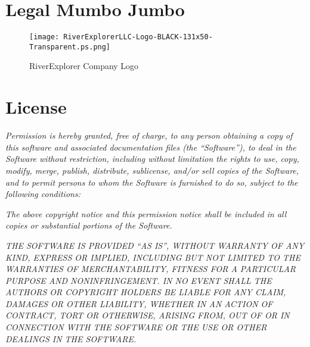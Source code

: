 \section{Legal Mumbo Jumbo}

  \begin{figure}
    \centering
    \texttt{[image: RiverExplorerLLC-Logo-BLACK-131x50-Transparent.ps.png]}
    \caption{RiverExplorer Company Logo}
    \label{fig:RiverExplorerLogo}
  \end{figure}
  
\section{License}
\textit{Permission is hereby granted, free of charge, to any person obtaining a copy of this software and associated documentation files (the “Software”), to deal in the Software without restriction, including without limitation the rights to use, copy, modify, merge, publish, distribute, sublicense, and/or sell copies of the Software, and to permit persons to whom the Software is furnished to do so, subject to the following conditions:}

\textit{The above copyright notice and this permission notice shall be included in all copies or substantial portions of the Software.}

\textit{THE SOFTWARE IS PROVIDED “AS IS”, WITHOUT WARRANTY OF ANY KIND, EXPRESS OR IMPLIED, INCLUDING BUT NOT LIMITED TO THE WARRANTIES OF MERCHANTABILITY, FITNESS FOR A PARTICULAR PURPOSE AND NONINFRINGEMENT. IN NO EVENT SHALL THE AUTHORS OR COPYRIGHT HOLDERS BE LIABLE FOR ANY CLAIM, DAMAGES OR OTHER LIABILITY, WHETHER IN AN ACTION OF CONTRACT, TORT OR OTHERWISE, ARISING FROM, OUT OF OR IN CONNECTION WITH THE SOFTWARE OR THE USE OR OTHER DEALINGS IN THE SOFTWARE.}
